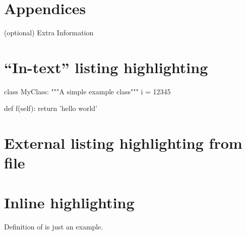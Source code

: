 \section{Appendices}
(optional) Extra Information

\section{``In-text'' listing highlighting}

\begin{python}
class MyClass:
    """A simple example class"""
    i = 12345

    def f(self):
        return 'hello world'
\end{python}

\section{External listing highlighting from file}


\section{Inline highlighting}

Definition of  is just an example.
